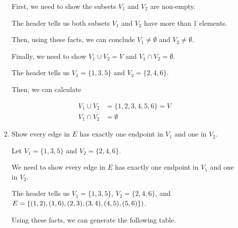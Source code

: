 \documentclass[12pt]{article}
\begin{document}
\begin{enumerate}[a.]
\begin{mdframed}
\begin{enumerate}[1.]
\begin{mdframed}
            \bigskip

            First, we need to show the subsets $V_1$ and $V_2$ are non-empty.

            \bigskip

            The header tells us both subsets $V_1$ and $V_2$ have more than
            1 elements.

            \bigskip

            Then, using these facts, we can conclude $V_1 \neq \emptyset$ and
            $V_2 \neq \emptyset$.

            \bigskip

            Finally, we need to show $V_1 \cup V_2 = V$ and $V_1 \cap V_2 = \emptyset$.

            \bigskip

            The header tells us $V_1 = \{1,3,5\}$ and $V_2 = \{2,4,6\}$.

            \bigskip

            Then, we can calculate

            \begin{align}
                V_1 \cup V_2 &= \{1,2,3,4,5,6\} = V\\
                V_1 \cap V_2 &= \emptyset
            \end{align}
            \end{mdframed}

            \item Show every edge in $E$ has exactly one endpoint in $V_1$ and one in $V_2$.

            \bigskip

            Let $V_1 = \{1,3,5\}$ and $V_2 = \{2,4,6\}$.

            \bigskip

            We need to show every edge in $E$ has exactly one endpoint in $V_1$ and
            one in $V_2$.

            \bigskip

            \begin{mdframed}

            The header tells us $V_1 = \{1,3,5\}$, $V_2 = \{2,4,6\}$,
            and $E = \{(1,2),(1,6),(2,3),\\(3,4),(4,5),(5,6)\})$.

            \bigskip

            Using these facts, we can generate the following table.

            \bigskip


\end{mdframed}
\end{enumerate}
\end{mdframed}
\end{enumerate}
\end{document}
